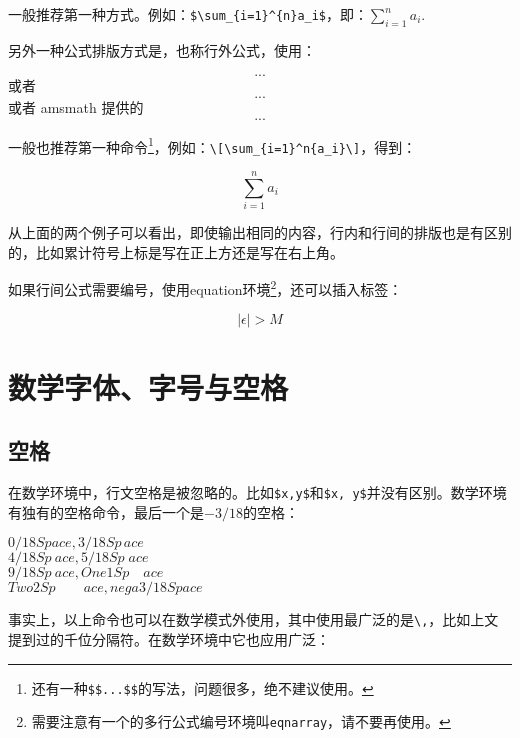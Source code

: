 {一般推荐第一种方式。例如：\verb|$\sum_{i=1}^{n}a_i$|，即：$\sum_{i=1}^{n}a_i$.

另外一种公式排版方式是，也称行外公式，使用：
\begin{latex}{}
\[...\] 或者 \begin{displaymath}...\end{displaymath}
或者 amsmath 提供的\begin{equation*}...\end{equation*}
\end{latex}

一般也推荐第一种命令\footnote{还有一种\texttt{\$\$...\$\$}的写法，问题很多，绝不建议使用。}，例如：\verb|\[\sum_{i=1}^n{a_i}\]|，得到：

\[\sum_{i=1}^{n}a_i\]

从上面的两个例子可以看出，即使输出相同的内容，行内和行间的排版也是有区别的，比如累计符号上标是写在正上方还是写在右上角。

如果行间公式需要编号，使用equation环境\footnote{需要注意有一个的多行公式编号环境叫\texttt{eqnarray}，请不要再使用。}，还可以插入标签：

\begin{codeshow}
\begin{equation}
\label{eq:NoExample}
  |\epsilon|>M
\end{equation}
\end{codeshow}

\section{数学字体、字号与空格}
\label{sec:mathfont}
\subsection{空格}
在数学环境中，行文空格是被忽略的。比如\verb|$x,y$|和\verb|$x, y$|并没有区别。数学环境有独有的空格命令，最后一个是$-3/18$的空格：

\begin{codeshow}
  $0/18Space,3/18Sp\,ace$ \\
  $4/18Sp\:ace,5/18Sp\;ace$ \\
  $9/18Sp\ ace,One1Sp\quad ace$ \\
  $Two2Sp\qquad ace,nega3/18Sp\!ace$
\end{codeshow}

事实上，以上命令也可以在数学模式外使用，其中使用最广泛的是\verb|\,|，比如上文提到过的千位分隔符。在数学环境中它也应用广泛：

}
